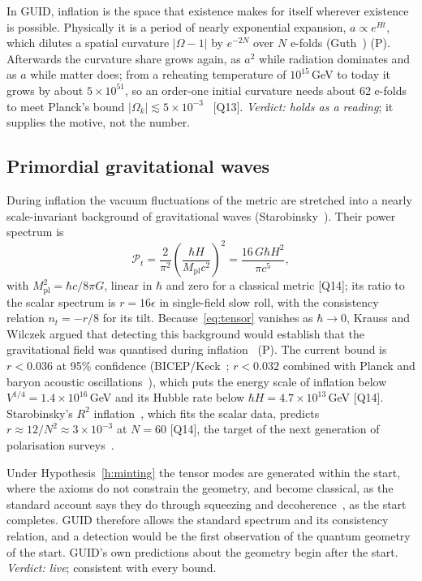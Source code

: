 \documentclass[11pt,a4paper]{article}
\theoremstyle{definition}
\theoremstyle{remark}
\newcommand{\chk}[1]{\textsf{[#1]}}
\newcommand{\tagP}{\textsf{(P)}}
\theoremstyle{definition}
\begin{document}
In GUID, inflation is the space that existence makes for itself wherever existence is possible. Physically it is a period of nearly
exponential expansion, $a\propto e^{Ht}$, which dilutes a spatial curvature $|\Omega-1|$ by $e^{-2N}$ over $N$ e-folds (Guth~\cite{guth})
\tagP. Afterwards the curvature share grows again, as $a^2$ while radiation dominates and as $a$ while matter does; from a reheating
temperature of $10^{15}$\,GeV to today it grows by about $5\times10^{51}$, so an order-one initial curvature needs about 62 e-folds to meet
Planck's bound $|\Omega_k|\lesssim5\times10^{-3}$~\cite{planck18} \chk{Q13}. \emph{Verdict: holds as a reading}; it supplies the motive, not
the number.

\subsection{Primordial gravitational waves}\label{sec:tensor}

During inflation the vacuum fluctuations of the metric are stretched into a nearly scale-invariant background of gravitational waves
(Starobinsky~\cite{starobinsky79}). Their power spectrum is
\begin{equation}\label{eq:tensor}
\mathcal P_t=\frac{2}{\pi^2}\left(\frac{\hbar H}{M_{\text{pl}}c^2}\right)^2=\frac{16\,G\hbar H^2}{\pi c^5},
\end{equation}
with $M_{\text{pl}}^2=\hbar c/8\pi G$, linear in $\hbar$ and zero for a classical metric \chk{Q14}; its ratio to the scalar spectrum is
$r=16\epsilon$ in single-field slow roll, with the consistency relation $n_t=-r/8$ for its tilt. Because~\eqref{eq:tensor} vanishes as
$\hbar\to0$, Krauss and Wilczek argued that detecting this background would establish that the gravitational field was quantised during
inflation~\cite{krausswilczek} \tagP. The current bound is $r<0.036$ at 95\% confidence (BICEP/Keck~\cite{bk18}; $r<0.032$ combined with
Planck and baryon acoustic oscillations~\cite{tristram}), which puts the energy scale of inflation below $V^{1/4}=1.4\times10^{16}$\,GeV
and its Hubble rate below $\hbar H=4.7\times10^{13}$\,GeV \chk{Q14}. Starobinsky's $R^2$ inflation~\cite{starobinsky80}, which fits the
scalar data, predicts $r\approx12/N^2\approx3\times10^{-3}$ at $N=60$ \chk{Q14}, the target of the next generation of polarisation
surveys~\cite{litebird}.

Under Hypothesis~\ref{h:minting} the tensor modes are generated within the start, where the axioms do not constrain the geometry,
and become classical, as the standard account says they do through squeezing and decoherence~\cite{polarski}, as the start completes. GUID
therefore allows the standard spectrum and its consistency relation, and a detection would be the first observation of the quantum
geometry of the start. GUID's own predictions about the geometry begin after the start. \emph{Verdict: live}; consistent with every bound.
\end{document}
